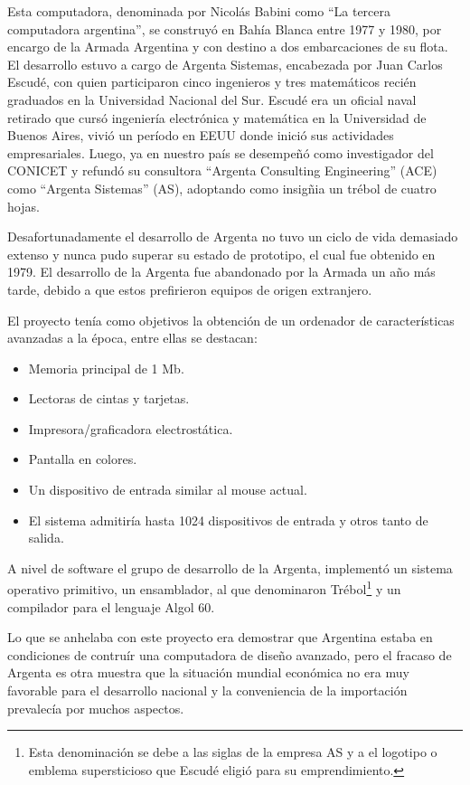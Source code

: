 \documentclass[%
 	final,
%
	notitlepage,
	narroweqnarray,
	inline,
 	twoside,
	]{ieee}
\begin{document}
Esta computadora, denominada por Nicol\'as Babini\cite{babini2} como ``La tercera computadora argentina'', se construy\'o en Bah\'ia Blanca entre 1977 y 1980, por encargo de la Armada Argentina y con destino a dos embarcaciones de su flota. El desarrollo estuvo a cargo de Argenta Sistemas, encabezada por Juan Carlos Escud\'e, con quien participaron cinco ingenieros y tres matem\'aticos reci\'en graduados en la Universidad Nacional del Sur. 
Escud\'e era un oficial naval retirado que curs\'o ingenier\'ia electr\'onica y matem\'atica en la Universidad de Buenos Aires, vivi\'o un per\'iodo en EEUU donde inici\'o sus actividades empresariales. Luego, ya en nuestro pa\'is se desempe\~n\'o como investigador del CONICET y refund\'o su consultora ``Argenta Consulting Engineering'' (ACE) como ``Argenta Sistemas'' (AS), adoptando como insig\~nia un tr\'ebol de cuatro hojas.

Desafortunadamente el desarrollo de Argenta no tuvo un ciclo de vida demasiado extenso y nunca pudo superar su estado de prototipo, el cual fue obtenido en 1979. El desarrollo de la Argenta fue abandonado por la Armada un a\~no m\'as tarde, debido a que estos prefirieron equipos de origen extranjero. 

El proyecto ten\'ia como objetivos la obtenci\'on de un ordenador de caracter\'isticas avanzadas a la \'epoca, entre ellas se destacan:\\

\begin{itemize}
\item Memoria principal de 1 Mb.
\item Lectoras de cintas y tarjetas.
\item Impresora/graficadora electrost\'atica.
\item Pantalla en colores. 
\item Un dispositivo de entrada similar al mouse actual. 
\item El sistema admitir\'ia hasta 1024 dispositivos de entrada y otros tanto de salida.\\
\end{itemize}

A nivel de software el grupo de desarrollo de la Argenta, implement\'o un sistema operativo primitivo, un ensamblador, al que denominaron Tr\'ebol\footnote{Esta denominaci\'on se debe a las siglas de la empresa AS y a el logotipo o emblema supersticioso que Escud\'e eligi\'o para su emprendimiento.} y un compilador para el lenguaje Algol 60.

Lo que se anhelaba con este proyecto era demostrar que Argentina estaba en condiciones de contru\'ir una computadora de dise\~no avanzado, pero el fracaso de Argenta es otra muestra que la situaci\'on mundial econ\'omica no era muy favorable para el desarrollo nacional y la conveniencia de la importaci\'on prevalec\'ia por muchos aspectos.
\end{document}

